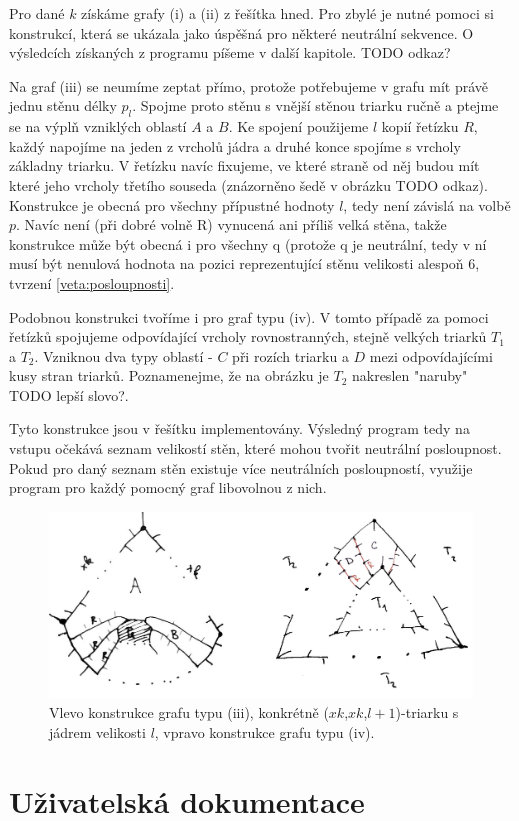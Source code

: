 Pro dané $k$ získáme grafy (i) a (ii) z řešítka hned. Pro zbylé je nutné pomoci si konstrukcí, která se ukázala jako úspěšná pro některé neutrální sekvence. O výsledcích získaných z programu píšeme v další kapitole. TODO odkaz?

Na graf (iii) se neumíme zeptat přímo, protože potřebujeme v grafu mít právě jednu stěnu délky $p_l$. Spojme proto stěnu s vnější stěnou triarku ručně a ptejme se na výplň vzniklých oblastí $A$ a $B$. Ke spojení použijeme $l$ kopií řetízku $R$, každý napojíme na jeden z vrcholů jádra a druhé konce spojíme s  vrcholy základny triarku. V řetízku navíc fixujeme, ve které straně od něj budou mít které jeho vrcholy třetího souseda (znázorněno šedě v obrázku TODO odkaz). Konstrukce je obecná pro všechny přípustné hodnoty $l$, tedy není závislá na volbě $p$. Navíc není (při dobré volně R) vynucená ani příliš velká stěna, takže konstrukce může být obecná i pro všechny q (protože q je neutrální, tedy v ní musí být nenulová hodnota na pozici reprezentující stěnu velikosti alespoň 6, tvrzení \eqref{veta:posloupnosti}.



Podobnou konstrukci tvoříme i pro graf typu (iv). V tomto případě za pomoci řetízků spojujeme odpovídající vrcholy rovnostranných, stejně velkých triarků $T_1$ a $T_2$. Vzniknou dva typy oblastí - $C$ při rozích triarku a $D$ mezi odpovídajícími kusy stran triarků. Poznamenejme, že na obrázku je $T_2$ nakreslen "naruby" TODO lepší slovo?. 

Tyto konstrukce jsou v řešítku implementovány. Výsledný program tedy na vstupu očekává seznam velikostí stěn, které mohou tvořit neutrální posloupnost. Pokud pro daný seznam stěn existuje více neutrálních posloupností, využije program pro každý pomocný graf libovolnou z nich.

\begin{figure}[h!]\centering
\includegraphics[width = \textwidth]{../img/iii+iv-construction}
\caption{Vlevo konstrukce grafu typu (iii), konkrétně ($xk$,$xk$,$l+1$)-triarku s jádrem velikosti $l$, vpravo konstrukce grafu typu (iv).}
\label{obr03:konstrukce}

\end{figure}

\section{Uživatelská dokumentace}


